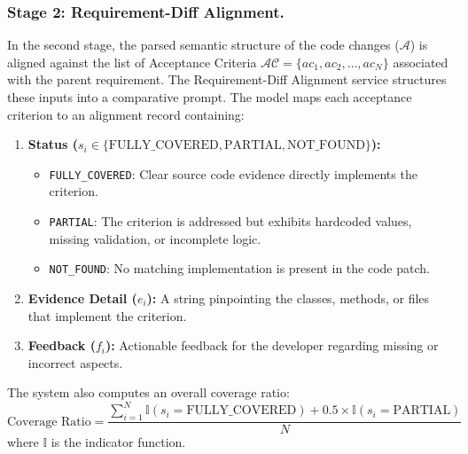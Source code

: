 \subsubsection{Stage 2: Requirement-Diff Alignment.}
In the second stage, the parsed semantic structure of the code changes ($\mathcal{A}$) is aligned against the list of Acceptance Criteria $\mathcal{AC} = \{ac_1, ac_2, \dots, ac_N\}$ associated with the parent requirement. The Requirement-Diff Alignment service structures these inputs into a comparative prompt. The model maps each acceptance criterion to an alignment record containing:
\begin{enumerate}
    \item \textbf{Status ($s_i \in \{\text{FULLY\_COVERED}, \text{PARTIAL}, \text{NOT\_FOUND}\}$):}
    \begin{itemize}
        \item \texttt{FULLY\_COVERED}: Clear source code evidence directly implements the criterion.
        \item \texttt{PARTIAL}: The criterion is addressed but exhibits hardcoded values, missing validation, or incomplete logic.
        \item \texttt{NOT\_FOUND}: No matching implementation is present in the code patch.
    \end{itemize}
    \item \textbf{Evidence Detail ($e_i$):} A string pinpointing the classes, methods, or files that implement the criterion.
    \item \textbf{Feedback ($f_i$):} Actionable feedback for the developer regarding missing or incorrect aspects.
\end{enumerate}

The system also computes an overall coverage ratio:
\begin{equation}
\text{Coverage Ratio} = \frac{\sum_{i=1}^N \mathbb{I}(s_i = \text{FULLY\_COVERED}) + 0.5 \times \mathbb{I}(s_i = \text{PARTIAL})}{N}
\end{equation}
where $\mathbb{I}$ is the indicator function.

